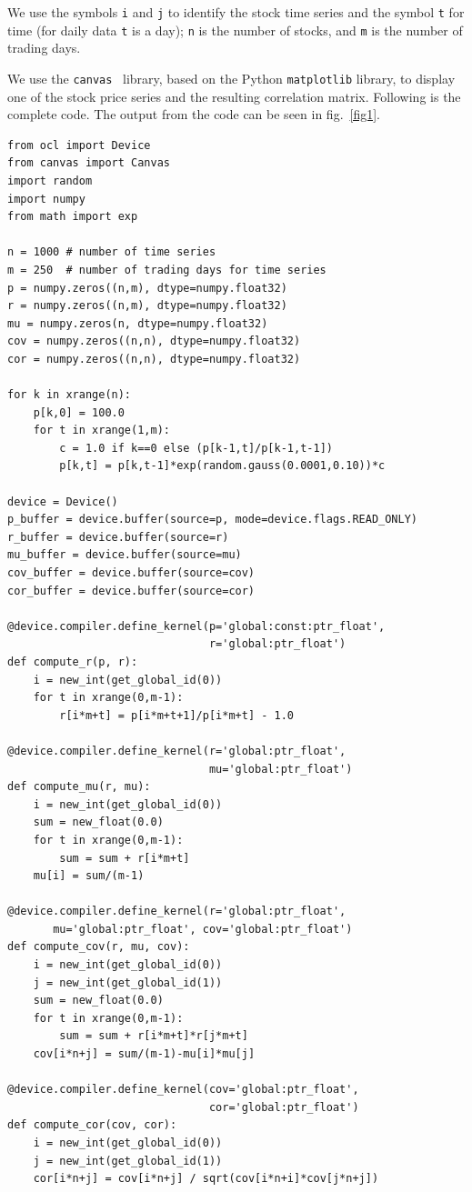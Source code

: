 \documentclass[justified,sixbynine]{tufte-book}
\def\ft{\small\tt}
\theoremstyle{plain}%
\theoremstyle{definition}
\theoremstyle{remark}
\begin{document}
\begin{fullwidth}
We use the symbols {\ft i} and {\ft j} to identify the stock time series and the symbol {\ft t} for time (for daily data {\ft t} is a day); {\ft n} is the number of stocks, and {\ft m} is the number of trading days.

We use the {\ft canvas}~\cite{canvas} library, based on the Python {\ft matplotlib} library, to display one of the stock price series and the resulting correlation matrix. Following is the complete code. The output from the code can be seen in fig.~\ref{fig1}.

\begin{lstlisting}
from ocl import Device
from canvas import Canvas
import random
import numpy
from math import exp

n = 1000 # number of time series
m = 250  # number of trading days for time series
p = numpy.zeros((n,m), dtype=numpy.float32)
r = numpy.zeros((n,m), dtype=numpy.float32)
mu = numpy.zeros(n, dtype=numpy.float32)
cov = numpy.zeros((n,n), dtype=numpy.float32)
cor = numpy.zeros((n,n), dtype=numpy.float32)

for k in xrange(n):
    p[k,0] = 100.0
    for t in xrange(1,m):
        c = 1.0 if k==0 else (p[k-1,t]/p[k-1,t-1])
        p[k,t] = p[k,t-1]*exp(random.gauss(0.0001,0.10))*c

device = Device()
p_buffer = device.buffer(source=p, mode=device.flags.READ_ONLY)
r_buffer = device.buffer(source=r)
mu_buffer = device.buffer(source=mu)
cov_buffer = device.buffer(source=cov)
cor_buffer = device.buffer(source=cor)

@device.compiler.define_kernel(p='global:const:ptr_float',
                               r='global:ptr_float')
def compute_r(p, r):
    i = new_int(get_global_id(0))
    for t in xrange(0,m-1):
        r[i*m+t] = p[i*m+t+1]/p[i*m+t] - 1.0

@device.compiler.define_kernel(r='global:ptr_float',
                               mu='global:ptr_float')
def compute_mu(r, mu):
    i = new_int(get_global_id(0))
    sum = new_float(0.0)
    for t in xrange(0,m-1):
        sum = sum + r[i*m+t]
    mu[i] = sum/(m-1)

@device.compiler.define_kernel(r='global:ptr_float',
       mu='global:ptr_float', cov='global:ptr_float')
def compute_cov(r, mu, cov):
    i = new_int(get_global_id(0))
    j = new_int(get_global_id(1))
    sum = new_float(0.0)
    for t in xrange(0,m-1):
        sum = sum + r[i*m+t]*r[j*m+t]
    cov[i*n+j] = sum/(m-1)-mu[i]*mu[j]

@device.compiler.define_kernel(cov='global:ptr_float',
                               cor='global:ptr_float')
def compute_cor(cov, cor):
    i = new_int(get_global_id(0))
    j = new_int(get_global_id(1))
    cor[i*n+j] = cov[i*n+j] / sqrt(cov[i*n+i]*cov[j*n+j])


\end{lstlisting}
\end{fullwidth}
\end{document}
